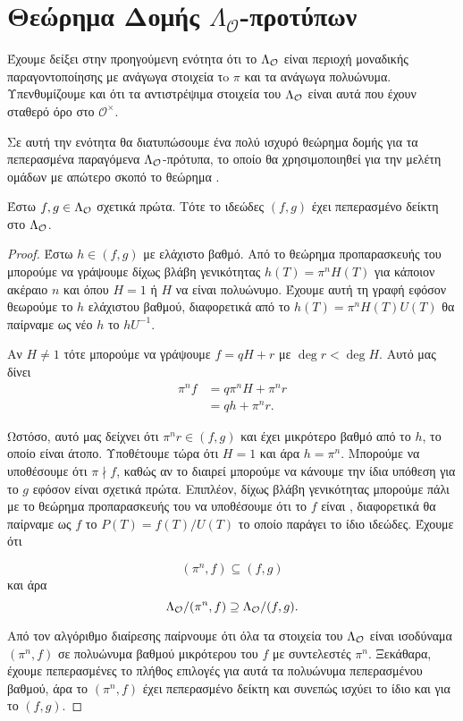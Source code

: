 \section{Θεώρημα Δομής $\Lambda_{\mathcal{O}}$-προτύπων}

Έχουμε δείξει στην προηγούμενη ενότητα ότι το $\Lambda_\mathcal{O}$ είναι περιοχή μοναδικής παραγοντοποίησης με ανάγωγα στοιχεία τo $\pi$ και τα ανάγωγα  πολυώνυμα. Υπενθυμίζουμε και ότι τα αντιστρέψιμα στοιχεία του $\Lambda_\mathcal{O}$ είναι αυτά που έχουν σταθερό όρο στο $\mathcal{O}^\times$.

Σε αυτή την ενότητα θα διατυπώσουμε ένα πολύ ισχυρό θεώρημα δομής για τα πεπερασμένα παραγόμενα $\Lambda_\mathcal{O}$-πρότυπα, το οποίο θα χρησιμοποιηθεί για την μελέτη ομάδων  με απώτερο σκοπό το θεώρημα .

\begin{lemma}\label{lemma4.7}
    Έστω $f,g \in \Lambda_\mathcal{O}$ σχετικά πρώτα. Τότε το ιδεώδες $(f,g)$ έχει πεπερασμένο δείκτη στο $\Lambda_\mathcal{O}$.
\end{lemma}

\begin{proof}
    Έστω $h\in(f,g)$ με ελάχιστο βαθμό. Από το θεώρημα προπαρασκευής του  μπορούμε να γράψουμε δίχως βλάβη γενικότητας $h(T)=\pi^n H(T)$ για κάποιον ακέραιο $n$ και όπου $H=1$ ή $H$ να είναι  πολυώνυμο. Έχουμε αυτή τη γραφή εφόσον θεωρούμε το $h$ ελάχιστου βαθμού, διαφορετικά από το $h(T) = \pi^n H(T)U(T)$ θα παίρναμε ως νέο $h$ το $hU^{-1}$.

    Αν $H\neq 1$ τότε μπορούμε να γράψουμε $f=qH+r$ με $\deg r < \deg H$. Αυτό μας δίνει
\begin{align*}
    \pi^n f &= q\pi^n H + \pi^n r \\
    &= qh + \pi^n r.
\end{align*}

\noindent Ωστόσο, αυτό μας δείχνει ότι $\pi^n r \in (f,g)$ και έχει μικρότερο βαθμό από το $h$, το οποίο είναι άτοπο. Υποθέτουμε τώρα ότι $H=1$ και άρα $h=\pi^n$. Μπορούμε να υποθέσουμε ότι $\pi \nmid f$, καθώς αν το διαιρεί μπορούμε να κάνουμε την ίδια υπόθεση για το $g$ εφόσον είναι σχετικά πρώτα. Επιπλέον, δίχως βλάβη γενικότητας μπορούμε πάλι με το θεώρημα προπαρασκευής του  να υποθέσουμε ότι το $f$ είναι , διαφορετικά θα παίρναμε ως $f$ το $P(T) = f(T)/U(T)$ το οποίο παράγει το ίδιο ιδεώδες. Έχουμε ότι 

$$(\pi^n,f) \subseteq (f,g)$$ και άρα 
$$\Lambda_\mathcal{O}/(\pi^n,f) \supseteq \Lambda_\mathcal{O}/(f,g).$$

\noindent Από τον αλγόριθμο διαίρεσης παίρνουμε ότι όλα τα στοιχεία του $\Lambda_\mathcal{O}$ είναι ισοδύναμα  $(\pi^n,f)$ σε πολυώνυμα βαθμού μικρότερου του $f$ με συντελεστές  $\pi^n$. Ξεκάθαρα, έχουμε πεπερασμένες το πλήθος επιλογές για αυτά τα πολυώνυμα πεπερασμένου βαθμού, άρα το $(\pi^n,f)$ έχει πεπερασμένο δείκτη και συνεπώς ισχύει το ίδιο και για το $(f,g)$.
\end{proof}

